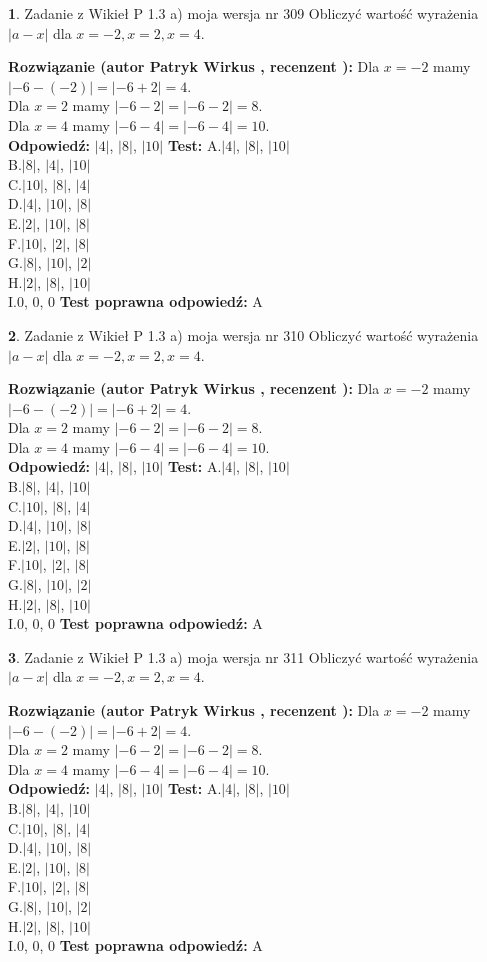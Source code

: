 \documentclass[12pt, a4paper]{article}
\theoremstyle{definition} %
\newtheorem{zad}{}
\newcommand{\zadStart}[1]{\begin{zad}#1\newline}
\newcommand{\zadStop}{\end{zad}}
\newcommand{\rozwStart}[2]{\noindent \textbf{Rozwiązanie (autor #1 , recenzent #2): }\newline}
\newcommand{\rozwStop}{\newline}
\newcommand{\odpStart}{\noindent \textbf{Odpowiedź:}\newline}
\newcommand{\odpStop}{\newline}
\newcommand{\testStart}{\noindent \textbf{Test:}\newline}
\newcommand{\testStop}{\newline}
\newcommand{\kluczStart}{\noindent \textbf{Test poprawna odpowiedź:}\newline}
\newcommand{\kluczStop}{\newline}
\begin{document}
\zadStart{Zadanie z Wikieł P 1.3 a) moja wersja nr 309}
Obliczyć wartość wyrażenia $|a - x|$ dla $x=-2,x=2,x=4$.
\zadStop
\rozwStart{Patryk Wirkus}{}
Dla $x = -2$ mamy $|-6 - (-2)| = |-6 + 2| = 4$.\\
Dla $x = 2$ mamy $|-6 - 2| = |-6 - 2| = 8$.\\
Dla $x = 4$ mamy $|-6 - 4| = |-6 - 4| = 10$.\\
\rozwStop
\odpStart
$|4|$, $|8|$, $|10|$
\odpStop
\testStart
A.$|4|$, $|8|$, $|10|$\\
B.$|8|$, $|4|$, $|10|$\\
C.$|10|$, $|8|$, $|4|$\\
D.$|4|$, $|10|$, $|8|$\\
E.$|2|$, $|10|$, $|8|$\\
F.$|10|$, $|2|$, $|8|$\\
G.$|8|$, $|10|$, $|2|$\\
H.$|2|$, $|8|$, $|10|$\\
I.$0$, $0$, $0$
\testStop
\kluczStart
A
\kluczStop



\zadStart{Zadanie z Wikieł P 1.3 a) moja wersja nr 310}
Obliczyć wartość wyrażenia $|a - x|$ dla $x=-2,x=2,x=4$.
\zadStop
\rozwStart{Patryk Wirkus}{}
Dla $x = -2$ mamy $|-6 - (-2)| = |-6 + 2| = 4$.\\
Dla $x = 2$ mamy $|-6 - 2| = |-6 - 2| = 8$.\\
Dla $x = 4$ mamy $|-6 - 4| = |-6 - 4| = 10$.\\
\rozwStop
\odpStart
$|4|$, $|8|$, $|10|$
\odpStop
\testStart
A.$|4|$, $|8|$, $|10|$\\
B.$|8|$, $|4|$, $|10|$\\
C.$|10|$, $|8|$, $|4|$\\
D.$|4|$, $|10|$, $|8|$\\
E.$|2|$, $|10|$, $|8|$\\
F.$|10|$, $|2|$, $|8|$\\
G.$|8|$, $|10|$, $|2|$\\
H.$|2|$, $|8|$, $|10|$\\
I.$0$, $0$, $0$
\testStop
\kluczStart
A
\kluczStop



\zadStart{Zadanie z Wikieł P 1.3 a) moja wersja nr 311}
Obliczyć wartość wyrażenia $|a - x|$ dla $x=-2,x=2,x=4$.
\zadStop
\rozwStart{Patryk Wirkus}{}
Dla $x = -2$ mamy $|-6 - (-2)| = |-6 + 2| = 4$.\\
Dla $x = 2$ mamy $|-6 - 2| = |-6 - 2| = 8$.\\
Dla $x = 4$ mamy $|-6 - 4| = |-6 - 4| = 10$.\\
\rozwStop
\odpStart
$|4|$, $|8|$, $|10|$
\odpStop
\testStart
A.$|4|$, $|8|$, $|10|$\\
B.$|8|$, $|4|$, $|10|$\\
C.$|10|$, $|8|$, $|4|$\\
D.$|4|$, $|10|$, $|8|$\\
E.$|2|$, $|10|$, $|8|$\\
F.$|10|$, $|2|$, $|8|$\\
G.$|8|$, $|10|$, $|2|$\\
H.$|2|$, $|8|$, $|10|$\\
I.$0$, $0$, $0$
\testStop
\kluczStart
A
\kluczStop
\end{document}
